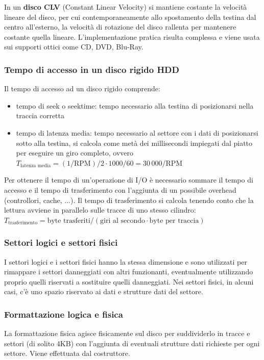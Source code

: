 \documentclass[a4paper]{article}
\begin{document}
In un \textbf{disco CLV} (Constant Linear Velocity) si mantiene costante la velocità lineare del disco, per cui contemporaneamente allo
spostamento della testina dal centro all'esterno, la velocità di rotazione del disco rallenta per mantenere costante quella
lineare. L'implementazione pratica risulta complessa e viene usata sui supporti ottici come CD, DVD, Blu-Ray.

\subsubsection*{Tempo di accesso in un disco rigido HDD}
Il tempo di accesso ad un disco rigido comprende:
\begin{itemize}
	\item tempo di seek o seektime: tempo necessario alla testina di posizionarsi nella traccia corretta
	\item tempo di latenza media: tempo necessario al settore con i dati di posizionarsi sotto alla testina, si calcola come metà
	dei millisecondi impiegati dal piatto per eseguire un giro completo, ovvero \(T_\text{latenza media} = (1/\text{RPM})/2 \cdot 1000/60 = 30\,000 / \text{RPM}\)
\end{itemize}
Per ottenere il tempo di un'operazione di I/O è necessario sommare il tempo di accesso e il tempo di trasferimento con l'aggiunta
di un possibile overhead (controllori, cache, ...). Il tempo di trasferimento si calcola tenendo conto che la lettura avviene in
parallelo sulle tracce di uno stesso cilindro: \\
\(T_\text{trasferimento} = \text{byte trasferiti} / (\text{giri al secondo} \cdot \text{byte per traccia})\)

\subsubsection*{Settori logici e settori fisici}
I settori logici e i settori fisici hanno la stessa dimensione e sono utilizzati per rimappare i settori danneggiati con altri
funzionanti, eventualmente utilizzando proprio quelli riservati a sostituire quelli danneggiati. Nei settori fisici, in alcuni
casi, c'è uno spazio riservato ai dati e strutture dati del settore.

\subsubsection*{Formattazione logica e fisica}
La formattazione fisica agisce fisicamente sul disco per suddividerlo in tracce e settori (di solito 4KB) con l'aggiunta di
eventuali strutture dati richieste per ogni settore. Viene effettuata dal costruttore.
\end{document}
